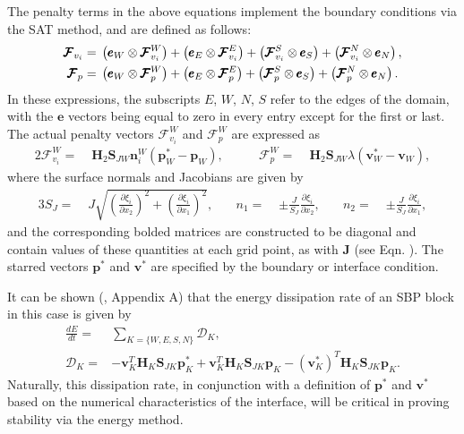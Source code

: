 The penalty terms in the above equations implement the boundary conditions via the
SAT method, and are defined as follows:
\begin{align}
  \pmb{\mathcal{F}}_{v_{i}} =\;&
	\left(  \pmb{e}_{W} \otimes \pmb{\mathcal{F}}^{W}_{v_{i}} \right)
	+ \left(  \pmb{e}_{E} \otimes \pmb{\mathcal{F}}^{E}_{v_{i}} \right)
	+ \left( \pmb{\mathcal{F}}^{S}_{v_{i}} \otimes \pmb{e}_{S} \right)
	+ \left( \pmb{\mathcal{F}}^{N}_{v_{i}} \otimes \pmb{e}_{N} \right),\\
  \pmb{\mathcal{F}}_{p} =\;&
    \left( \pmb{e}_{W} \otimes \pmb{\mathcal{F}}^{W}_{p} \right)
	+ \left( \pmb{e}_{E} \otimes \pmb{\mathcal{F}}^{E}_{p} \right)
	+ \left( \pmb{\mathcal{F}}^{S}_{p} \otimes \pmb{e}_{S} \right)
	+ \left( \pmb{\mathcal{F}}^{N}_{p} \otimes \pmb{e}_{N} \right).
\end{align}
In these expressions, the subscripts $E$, $W$, $N$, $S$ refer to the edges
of the domain, with the $\pmb{e}$ vectors being equal to zero in every entry except
for the first or last. The actual penalty vectors $\pmb{\mathcal{F}}^{W}_{v_{i}}$ and
$\pmb{\mathcal{F}}^{W}_{p}$ are expressed as 
\begin{alignat}{2}
	\pmb{\mathcal{F}}^{W}_{v_{i}} =\;& \pmb{H}_{2} \pmb{S}_{JW} \pmb{n}^{W}_{i}
	\left( \pmb{p}^*_{W} - \pmb{p}_{W} \right),\qquad&
			  \pmb{\mathcal{F}}^{W}_{p} =\;& \pmb{H}_{2}\pmb{S}_{JW}
  \lambda
	\left( \pmb{v}^*_{W} - \pmb{v}_{W} \right),
\end{alignat}
where the surface normals and Jacobians are given by
\begin{alignat}{3}
	S_{J} =\;& J\sqrt{{\left(\frac{\partial \xi_{i}}{\partial x_{2}}\right)}^2 + {\left(\frac{\partial \xi_{i}}{\partial x_{1}}\right)}^2},\quad&
	n_{1} =\;& \pm\frac{J}{S_{J}} \frac{\partial \xi_{i}}{\partial x_{2}},\quad&
	n_{2} =\;& \pm\frac{J}{S_{J}} \frac{\partial \xi_{i}}{\partial x_{1}}, \label{eq:norms_jac}
\end{alignat}
and the corresponding bolded matrices are constructed to be diagonal and contain
values of these quantities at each grid point, as with $\pmb{J}$ (see Eqn. ).
The starred vectors $\pmb{p}^{*}$ and $\pmb{v}^{*}$ are specified by the boundary
or interface condition.

It can be shown (\cite{kozdon2016stable}, Appendix A) that the energy dissipation rate
of an SBP block in this case is given by
\begin{align}
  \frac{dE}{dt} = & \sum_{K = \{W,E,S,N\}} \mathcal{D}_{K},\\
  \mathcal{D}_{K} = &
  - \pmb{v}_{K}^{T}\pmb{H}_{K}\pmb{S}_{JK}\pmb{p}^{*}_{K}
  + \pmb{v}_{K}^{T}\pmb{H}_{K}\pmb{S}_{JK}\pmb{p}_{K}
	- {\left(\pmb{v}^{*}_{K}\right)}^{T}\pmb{H}_{K}\pmb{S}_{JK}\pmb{p}_{K}. \label{eq:sbp_diss}
\end{align}
Naturally, this dissipation rate, in conjunction with a definition of
$\pmb{p}^{*}$ and $\pmb{v}^{*}$ based on the numerical characteristics
of the interface, will be critical in proving stability via the energy
method.

